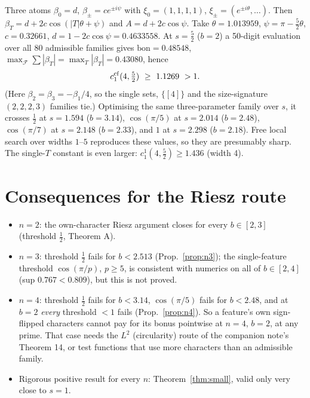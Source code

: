 \documentclass[11pt]{article}
\theoremstyle{definition}\newtheorem{definition}[theorem]{Definition}\newtheorem{remark}[theorem]{Remark}
\begin{document}
\begin{proposition}[$n=4$, explicit]\label{prop:n4}
Three atoms $\beta_0=d$, $\beta_\pm=ce^{\pm i\psi}$ with $\xi_0=(1,1,1,1)$, $\xi_\pm=(e^{\pm i\theta},\dots)$.  Then
$\beta_T=d+2c\cos(|T|\theta+\psi)$ and $A=d+2c\cos\psi$.  Take
$\theta=1.013959$, $\psi=\pi-\tfrac52\theta$, $c=0.32661$, $d=1-2c\cos\psi=0.4633558$.  At $s=\frac52$ ($b=2$) a 50-digit
evaluation over all 80 admissible families gives $\mathrm{bon}=0.48548$, $\max_{\mathcal F}\sum|\beta_T|=\max_T|\beta_T|=0.43080$, hence
\[c_1^{\rm cf}(4,\tfrac52)\ \ge\ 1.1269\ >1 .\]
(Here $\beta_2=\beta_3=-\beta_1/4$, so the single sets, $\{[4]\}$ and the size-signature $(2,2,2,3)$ families tie.)  Optimising the same
three-parameter family over $s$, it crosses $\frac12$ at $s=1.594$ ($b=3.14$), $\cos(\pi/5)$ at $s=2.014$ ($b=2.48$),
$\cos(\pi/7)$ at $s=2.148$ ($b=2.33$), and $1$ at $s=2.298$ ($b=2.18$).  Free local search over widths $1$--$5$ reproduces these
values, so they are presumably sharp.  The single-$T$ constant is even larger: $c_1^1(4,\frac52)\ge1.436$ (width 4).
\end{proposition}

\section{Consequences for the Riesz route}
\begin{itemize}
\item $n=2$: the own-character Riesz argument closes for every $b\in[2,3]$ (threshold $\frac12$, Theorem A).
\item $n=3$: threshold $\frac12$ fails for $b<2.513$ (Prop.~\ref{prop:n3}); the single-feature threshold $\cos(\pi/p)$, $p\ge5$, is
consistent with numerics on all of $b\in[2,4]$ (sup $0.767<0.809$), but this is not proved.
\item $n=4$: threshold $\frac12$ fails for $b<3.14$, $\cos(\pi/5)$ fails for $b<2.48$, and at $b=2$ \emph{every} threshold $<1$ fails
(Prop.~\ref{prop:n4}).  So a feature's own sign-flipped characters cannot pay for its bonus pointwise at $n=4$, $b=2$, at any prime.
That case needs the $L^2$ (circularity) route of the companion note's Theorem 14, or test functions that use more characters
than an admissible family.
\item Rigorous positive result for every $n$: Theorem~\ref{thm:small}, valid only very close to $s=1$.
\end{itemize}
\end{document}

